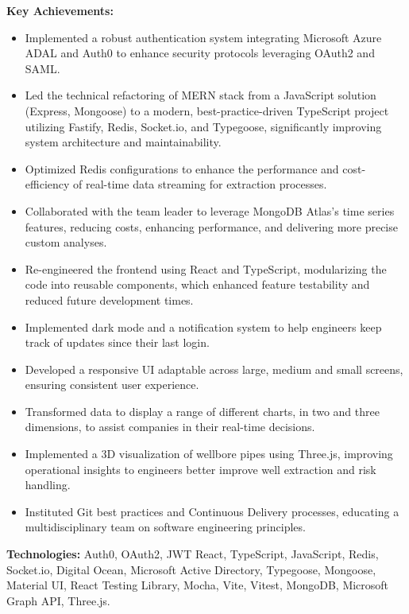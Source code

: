 \documentclass[10pt,a4paper]{altacv}
\begin{document}
\textbf{Key Achievements:}
\begin{itemize}
\setlength{\itemindent}{0.5em}
\item[--] Implemented a robust authentication system integrating Microsoft Azure ADAL and Auth0 to enhance security protocols leveraging OAuth2 and SAML.
\item[--] Led the technical refactoring of MERN stack from a JavaScript solution (Express, Mongoose) to a modern, best-practice-driven TypeScript project utilizing Fastify, Redis, Socket.io, and Typegoose, significantly improving system architecture and maintainability.
\item[--]  Optimized Redis configurations to enhance the performance and cost-efficiency of real-time data streaming for extraction processes.
\item[--]  Collaborated with the team leader to leverage MongoDB Atlas’s time series features, reducing costs, enhancing performance, and delivering more precise custom analyses.
\item[--] Re-engineered the frontend using React and TypeScript, modularizing the code into reusable components, which enhanced feature testability and reduced future development times.
\item[--]  Implemented dark mode and a notification system to help engineers keep track of updates since their last login.
\item[--] Developed a responsive UI adaptable across large, medium and small screens, ensuring consistent user experience.
\item[--] Transformed data to display a range of different charts, in two and three dimensions, to assist companies in their real-time decisions. 
\item[--] Implemented a 3D visualization of wellbore pipes using Three.js, improving operational insights to engineers better improve well extraction and risk handling.
\item[--] Instituted Git best practices and Continuous Delivery processes, educating a multidisciplinary team on software engineering principles.
\end{itemize}

\textbf{Technologies:} Auth0, OAuth2, JWT React, TypeScript, JavaScript, Redis, Socket.io, Digital Ocean, Microsoft Active Directory, Typegoose, Mongoose, Material UI, React Testing Library, Mocha, Vite, Vitest, MongoDB, Microsoft Graph API, Three.js.

\break
\newpage
{}
\end{document}
